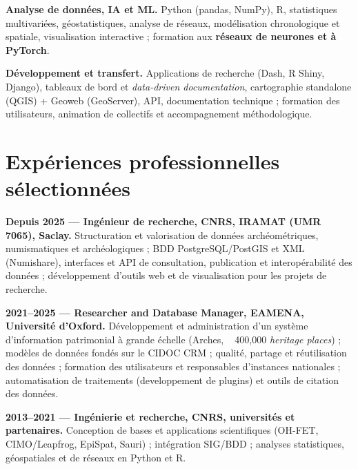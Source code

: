 \documentclass[10pt,a4paper]{article}
\begin{document}
\textbf{Analyse de données, IA et ML.} Python (pandas, NumPy), R, statistiques multivariées, géostatistiques, analyse de réseaux, modélisation chronologique et spatiale, visualisation interactive ; formation aux \textbf{réseaux de neurones et à PyTorch}.

\textbf{Développement et transfert.} Applications de recherche (Dash, R Shiny, Django), tableaux de bord et \textit{data-driven documentation}, cartographie standalone (QGIS) + Geoweb (GeoServer), API, documentation technique ; formation des utilisateurs, animation de collectifs et accompagnement méthodologique.

\section*{Expériences professionnelles sélectionnées}
\textbf{Depuis 2025 --- Ingénieur de recherche, CNRS, IRAMAT (UMR 7065), Saclay.} Structuration et valorisation de données archéométriques, numismatiques et archéologiques ; BDD PostgreSQL/PostGIS et XML (Numishare), interfaces et API de consultation, publication et interopérabilité des données ; développement d'outils web et de visualisation pour les projets de recherche.

\textbf{2021--2025 --- Researcher and Database Manager, EAMENA, Université d'Oxford.} Développement et administration d'un système d'information patrimonial à grande échelle (Arches, ~ 400,000 \textit{heritage places}) ; modèles de données fondés sur le CIDOC CRM ; qualité, partage et réutilisation des données ; formation des utilisateurs et responsables d'instances nationales ; automatisation de traitements (developpement de plugins) et outils de citation des données.

\textbf{2013--2021 --- Ingénierie et recherche, CNRS, universités et partenaires.} Conception de bases et applications scientifiques (OH-FET, CIMO/Leapfrog, EpiSpat, Sauri) ; intégration SIG/BDD ; analyses statistiques, géospatiales et de réseaux en Python et R.
\end{document}
